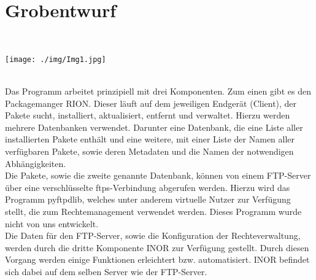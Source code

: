 \chapter{Grobentwurf}
\\[\intextsep]
\begin{minipage}{\linewidth}
\centering%
\texttt{[image: ./img/Img1.jpg]}%
\label{fig:Image 1}%
\end{minipage}
\\[\intextsep]

Das Programm arbeitet prinzipiell mit drei Komponenten. Zum einen gibt es den
Packagemanger RION. Dieser läuft auf dem jeweiligen Endgerät (Client), der Pakete sucht,
installiert, aktualisiert, entfernt und verwaltet. Hierzu werden mehrere Datenbanken
verwendet. Darunter eine Datenbank, die eine Liste aller installierten Pakete enthält und eine
weitere, mit einer Liste der Namen aller verfügbaren Pakete, sowie deren Metadaten und die
Namen der notwendigen Abhängigkeiten. \\


Die Pakete, sowie die zweite genannte Datenbank, können von einem FTP-Server über eine
verschlüsselte ftps-Verbindung abgerufen werden. Hierzu wird das Programm pyftpdlib,
welches unter anderem virtuelle Nutzer zur Verfügung stellt, die zum Rechtemanagement
verwendet werden. Dieses Programm wurde nicht von uns entwickelt.
\\

Die Daten für den FTP-Server, sowie die Konfiguration der Rechteverwaltung, werden durch
die dritte Komponente INOR zur Verfügung gestellt. Durch diesen Vorgang werden einige
Funktionen erleichtert bzw. automatisiert. INOR befindet sich dabei auf dem selben Server
wie der FTP-Server.\\   